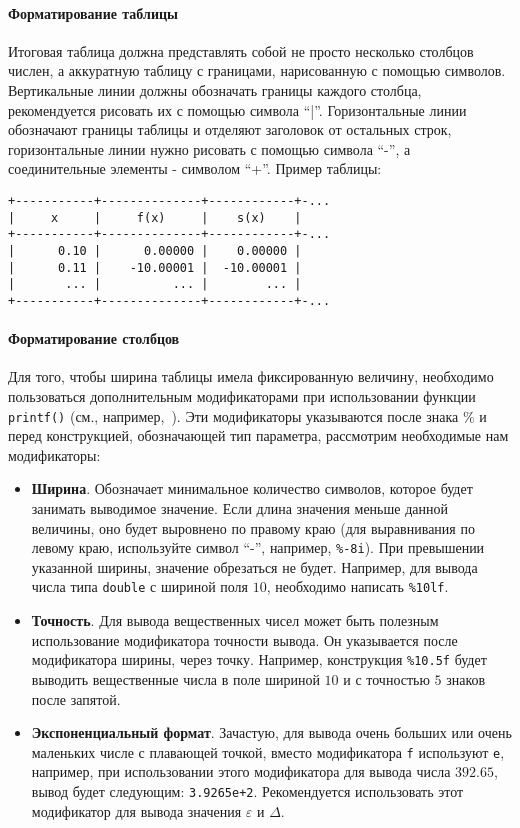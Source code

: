 \paragraph{Форматирование таблицы}
Итоговая таблица должна представлять собой не просто несколько столбцов числен, а аккуратную таблицу с границами, нарисованную с помощью символов.
Вертикальные линии должны обозначать границы каждого столбца, рекомендуется рисовать их с помощью символа ``|''. Горизонтальные линии обозначают границы таблицы и отделяют заголовок от остальных строк, горизонтальные линии нужно рисовать с помощью символа ``-'', а соединительные элементы - символом ``+''. Пример таблицы:
\begin{verbatim}
+-----------+--------------+------------+-...
|     x     |     f(x)     |    s(x)    |
+-----------+--------------+------------+-...
|      0.10 |      0.00000 |    0.00000 |
|      0.11 |    -10.00001 |  -10.00001 |
|       ... |          ... |        ... |
+-----------+--------------+------------+-...
\end{verbatim}

\paragraph{Форматирование столбцов}
Для того, чтобы ширина таблицы имела фиксированную величину, необходимо
пользоваться дополнительным модификаторами при использовании функции
\texttt{printf()} (см., например,~\cite{cppref}). Эти модификаторы указываются
после знака $\%$ и перед конструкцией, обозначающей тип параметра, рассмотрим
необходимые нам модификаторы:
%
\begin{itemize}
	\item \textbf{Ширина}. Обозначает минимальное количество символов, которое будет занимать выводимое значение. Если длина значения меньше данной величины, оно будет выровнено по правому краю (для выравнивания по левому краю, используйте символ ``-'', например, \verb|%-8i|). При превышении указанной ширины, значение обрезаться не будет. Например, для вывода числа типа \texttt{double} с шириной поля $10$, необходимо написать \verb|%10lf|.
	\item \textbf{Точность}. Для вывода вещественных чисел может быть полезным использование модификатора точности вывода. Он указывается после модификатора ширины, через точку. Например, конструкция \verb|%10.5f| будет выводить вещественные числа в поле шириной $10$ и с точностью $5$ знаков после запятой.
	\item \textbf{Экспоненциальный формат}. Зачастую, для вывода очень больших или очень маленьких числе с плавающей точкой, вместо модификатора \verb|f| используют \verb|e|, например, при использовании этого модификатора для вывода числа $392.65$, вывод будет следующим: \texttt{3.9265e+2}. Рекомендуется использовать этот модификатор для вывода значения $\varepsilon$ и $\Delta$.
\end{itemize}


